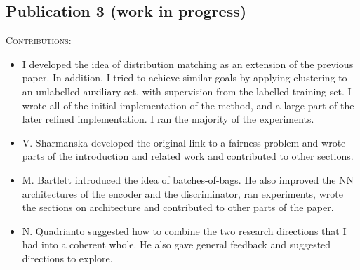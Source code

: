 \subsection{Publication 3 (work in progress)}
\begin{refsection}[allreferences]
    \nocite{kehrenberg2020zeroshot}
    \printbibliography[heading=none]
\end{refsection}%
\noindent\textsc{Contributions:}
\begin{itemize}
  \item I developed the idea of distribution matching as an extension of the previous paper.
    In addition, I tried to achieve similar goals by applying clustering to an unlabelled auxiliary set,
    with supervision from the labelled training set.
    I wrote all of the initial implementation of the method, and a large part of the later refined implementation.
    I ran the majority of the experiments.
  \item V. Sharmanska developed the original link to a fairness problem
    and wrote parts of the introduction and related work and contributed to other sections.
  \item M. Bartlett introduced the idea of batches-of-bags.
    He also improved the \ac{NN} architectures of the encoder and the discriminator,
    ran experiments, wrote the sections on architecture and contributed to other parts of the paper.
  \item N. Quadrianto suggested how to combine the two research directions that I had into a coherent whole.
    He also gave general feedback and suggested directions to explore.
\end{itemize}
